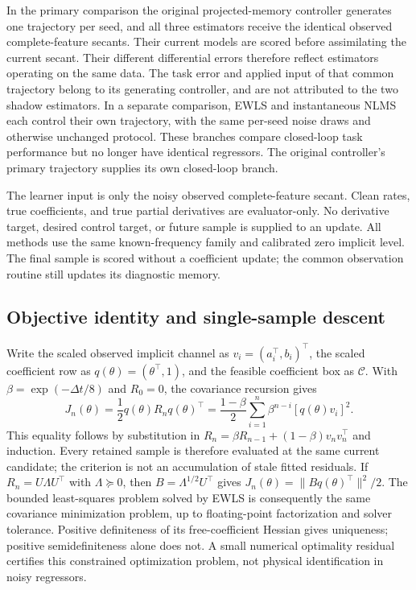 In the primary comparison the original projected-memory controller generates
one trajectory per seed, and all three estimators receive the identical observed
complete-feature secants. Their current models are scored before assimilating
the current secant. Their different differential errors therefore reflect
estimators operating on the same data. The task error and applied input of that
common trajectory belong to its generating controller, and are not attributed
to the two shadow estimators. In a separate comparison, EWLS and instantaneous
NLMS each control their own trajectory, with the same per-seed noise draws and
otherwise unchanged protocol. These branches compare closed-loop task
performance but no longer have identical regressors. The original controller's
primary trajectory supplies its own closed-loop branch.

The learner input is only the noisy observed complete-feature secant. Clean
rates, true coefficients, and true partial derivatives are evaluator-only.
No derivative target, desired control target, or future sample is supplied to
an update. All methods use the same known-frequency family and calibrated
zero implicit level. The final sample is scored without a coefficient update;
the common observation routine still updates its diagnostic memory.

\subsection{Objective identity and single-sample descent}
Write the scaled observed implicit channel as $v_i=(a_i^\top,b_i)^\top$,
the scaled coefficient row as $q(\theta)=(\theta^\top,1)$, and the feasible
coefficient box as $\mathcal C$. With $\beta=\exp(-\Delta t/8)$ and $R_0=0$,
the covariance recursion gives
\begin{equation}
 J_n(\theta)=\frac12q(\theta)R_nq(\theta)^\top
 =\frac{1-\beta}{2}\sum_{i=1}^n\beta^{n-i}
       [q(\theta)v_i]^2.
\end{equation}
This equality follows by substitution in
$R_n=\beta R_{n-1}+(1-\beta)v_nv_n^\top$ and induction.
Every retained sample is therefore evaluated at the same current candidate;
the criterion is not an accumulation of stale fitted residuals. If
$R_n=U\Lambda U^\top$ with $\Lambda\succeq0$, then
$B=\Lambda^{1/2}U^\top$ gives
$J_n(\theta)=\|Bq(\theta)^\top\|^2/2$. The bounded least-squares
problem solved by EWLS is consequently the same covariance minimization
problem, up to floating-point factorization and solver tolerance. Positive
definiteness of its free-coefficient Hessian gives uniqueness; positive
semidefiniteness alone does not. A small numerical optimality residual certifies
this constrained optimization problem, not physical identification in noisy
regressors.

